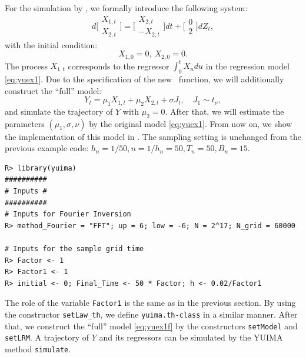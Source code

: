 For the simulation by , we formally introduce the following system:
\begin{equation}
d\Bigg[\begin{array}{c} X_{1,t}\\ X_{2,t}\end{array}\Bigg]=\Bigg[\begin{array}{c} X_{2,t}\\ -X_{2,t}\end{array}\Bigg]dt+\Bigg[\begin{array}{c} 0\\ 2\end{array}\Bigg]dZ_t,
\end{equation}
with the initial condition:
\[
X_{1,0}=0, \ X_{2,0}=0.
\]
The process \(X_{1,t}\) corresponds to the regressor \(\int_0^{t}X_{u}du\) in the regression model \eqref{eq:yuex1}.
Due to the specification of the new  ~function, we will additionally construct the ``full'' model:
\begin{equation}
Y_t=\mu_1 X_{1,t}+\mu_2 X_{2,t}+\sigma J_t, \quad J_1\sim t_\nu,
\label{eq:yuex1f}
\end{equation}
and simulate the trajectory of \(Y\) with \(\mu_2=0\).
After that, we will estimate the parameters \((\mu_1,\sigma,\nu)\) by the original model \eqref{eq:yuex1}.
From now on, we show the implementation of this model in .
The sampling setting is unchanged from the previous example code:
\(h_n=1/50,  n=1/h_n=50,  T_n=50,  B_n=15\).

\begin{verbatim}
R> library(yuima)
##########
# Inputs #
##########
# Inputs for Fourier Inversion
R> method_Fourier = "FFT"; up = 6; low = -6; N = 2^17; N_grid = 60000

# Inputs for the sample grid time
R> Factor <- 1
R> Factor1 <- 1
R> initial <- 0; Final_Time <- 50 * Factor; h <- 0.02/Factor1
\end{verbatim}

The role of the variable \texttt{Factor1} is the same as in the previous section.
By using the constructor \texttt{setLaw\_th}, we define \texttt{yuima.th-class} in a similar manner.
After that, we construct the ``full'' model \eqref{eq:yuex1f} by the constructors \texttt{setModel} and \texttt{setLRM}.
A trajectory of \(Y\) and its regressors can be simulated by the YUIMA method \texttt{simulate}.


